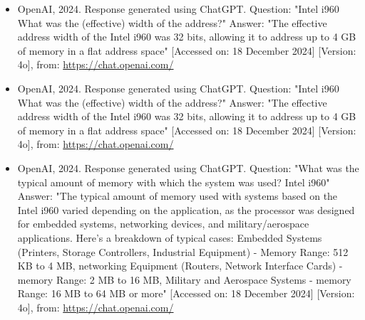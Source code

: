\documentclass{article}
\begin{document}
\begin{itemize}
\item OpenAI, 2024. Response generated using ChatGPT. Question: "Intel i960 What was  the (effective) width of the address?" Answer: "The effective address width of the Intel i960 was 32 bits, allowing it to address up to 4 GB of memory in a flat address space" [Accessed on: 18 December 2024] [Version: 4o], from: \url{https://chat.openai.com/}

\item OpenAI, 2024. Response generated using ChatGPT. Question: "Intel i960 What was  the (effective) width of the address?" Answer: "The effective address width of the Intel i960 was 32 bits, allowing it to address up to 4 GB of memory in a flat address space" [Accessed on: 18 December 2024] [Version: 4o], from: \url{https://chat.openai.com/}

\item OpenAI, 2024. Response generated using ChatGPT. Question: "What was the typical amount of memory with which the system was used? Intel i960" Answer: "The typical amount of memory used with systems based on the Intel i960 varied depending on the application, as the processor was designed for embedded systems, networking devices, and military/aerospace applications. Here’s a breakdown of typical cases: Embedded Systems (Printers, Storage Controllers, Industrial Equipment) - Memory Range: 512 KB to 4 MB, networking Equipment (Routers, Network Interface Cards) - memory Range: 2 MB to 16 MB, Military and Aerospace Systems - memory Range: 16 MB to 64 MB or more" [Accessed on: 18 December 2024] [Version: 4o], from: \url{https://chat.openai.com/}

\end{itemize}
\end{document}
